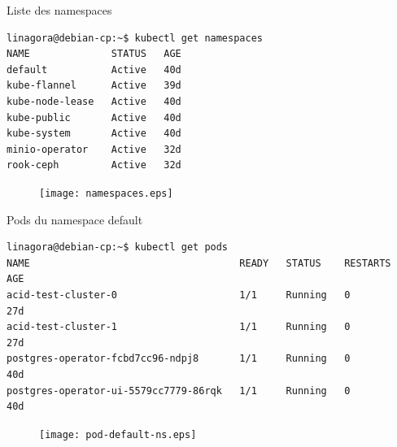 
\begin{frame}[fragile]{Liste des namespaces}

\begin{tiny}
\begin{Verbatim}[commandchars=\\\{\}]
linagora@debian-cp:~$ kubectl get namespaces
NAME              STATUS   AGE
default           Active   40d
kube-flannel      Active   39d
kube-node-lease   Active   40d
kube-public       Active   40d
kube-system       Active   40d
minio-operator    Active   32d
rook-ceph         Active   32d
\end{Verbatim}
\end{tiny}

\begin{figure}
\begin{center}
\texttt{[image: namespaces.eps]}
\end{center}
\end{figure}

\end{frame}


\begin{frame}[fragile]{Pods du namespace default}

\begin{tiny}
\begin{Verbatim}[commandchars=\\\{\}]
linagora@debian-cp:~$ kubectl get pods          
NAME                                    READY   STATUS    RESTARTS   AGE
acid-test-cluster-0                     1/1     Running   0          27d
acid-test-cluster-1                     1/1     Running   0          27d
postgres-operator-fcbd7cc96-ndpj8       1/1     Running   0          40d
postgres-operator-ui-5579cc7779-86rqk   1/1     Running   0          40d
\end{Verbatim}
\end{tiny}

\begin{figure}
\begin{center}
\texttt{[image: pod-default-ns.eps]}
\end{center}
\end{figure}

\end{frame}

